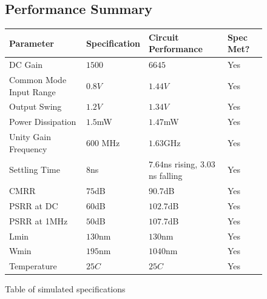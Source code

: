 \documentclass[]{article}
\begin{document}
			\begin{center}
			\begin{figure}
				\subsection{Performance Summary}
  				\begin{tabular}{ | l | l | l | p{2cm} |}
   			 		\hline
   			 		Parameter & Specification & Circuit Performance & Spec Met? \\ \hline
   			 		DC Gain & $1500$ & $6645$ & Yes\\ \hline
    					Common Mode Input Range & $0.8V$ & $1.44V$ & Yes\\ \hline
    					Output Swing & $1.2V$ & $1.34V$ & Yes\\ \hline
					Power Dissipation & $1.5$mW & $1.47$mW & Yes\\ \hline
					Unity Gain Frequency & $600$ MHz &  $1.63$GHz & Yes\\ \hline
					Settling Time & $8$ns & $7.64$ns rising, $3.03$ns falling & Yes\\ \hline
					CMRR & $75$dB & $90.7$dB & Yes\\ \hline
					PSRR at DC & $60$dB & $102.7$dB & Yes\\ \hline
					PSRR at 1MHz & $50$dB & $107.7$dB & Yes\\ \hline
					Lmin & $130$nm & $130$nm & Yes\\ \hline
					Wmin & $195$nm & $1040$nm & Yes\\ \hline
					Temperature & $25C$ & $25C$ & Yes\\ \hline
  			  	\end{tabular}
			\caption{Table of simulated specifications}
			\end{figure}
			\end{center}
			
		\newpage
		
\end{document}
